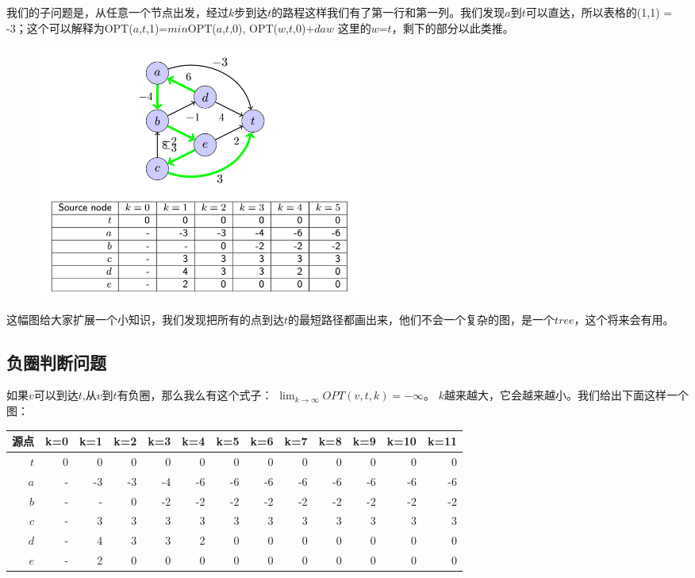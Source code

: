 我们的子问题是，从任意一个节点出发，经过$k$步到达$t$的路程这样我们有了第一行和第一列。我们发现$a$到$t$可以直达，所以表格的(1,1) = -3；这个可以解释为OPT($a$,$t$,1)=$min${OPT($a$,$t$,0), OPT($w$,$t$,0)+$d${$aw$}} 这里的$w$=$t$，剩下的部分以此类推。


\begin{figure}[H]
\centering
\includegraphics[width=4.2in]{tree.png}
\end{figure}
这幅图给大家扩展一个小知识，我们发现把所有的点到达$t$的最短路径都画出来，他们不会一个复杂的图，是一个$tree$，这个将来会有用。

\subsection{负圈判断问题}
如果$v$可以到达$t$,从$v$到$t$有负圈，那么我么有这个式子： $\lim_{k \rightarrow \infty} OPT(  v, t, k ) = - \infty $。
$k$越来越大，它会越来越小。我们给出下面这样一个图：
\begin{table}[H]
\begin{tabular}{|r|r|r|r|r|r|r|r|r|r|r|r|r|}
\hline
源点   & k=0  & k=1 & k=2 & k=3 & k=4 & k=5 & k=6 & k=7 & k=8 & k=9 &k=10& k=11 \\ \hline
$t$ & 0 & 0 & 0 & 0 & 0 & 0 & 0 & 0 & 0 & 0 & 0 & 0\\ \hline
$a$ & - & -3 & -3 & -4 & -6 & -6 & -6 &-6  & -6 & -6 & -6 & -6 \\ \hline
$b$ & - & - & 0 & -2 & -2 & -2 & -2 & -2 & -2 & -2 & -2 & -2 \\ \hline
$c$ & - & 3 & 3 & 3 & 3 & 3 &  3&  3&  3&  3&  3&  3\\ \hline
$d$ & - & 4 & 3 & 3 & 2 & 0 &  0 & 0  & 0  & 0  & 0  & 0  \\ \hline
$e$ & - & 2 & 0 & 0 & 0 & 0 &  0 &  0 & 0  & 0  &  0 &  0 \\ \hline
\end{tabular}
\end{table}

